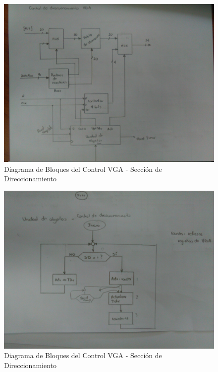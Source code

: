 \documentclass[12pt,a4paper]{report}
\begin{document}
\begin{figure}[hbtp]
	\centering
	\includegraphics[width=15cm]{Img/ControlDireccionamientoVGABloques.jpg}
	\caption{Diagrama de Bloques del Control VGA - Sección de Direccionamiento}
	\label{fig:DireccionamientoBloquesVGA1}
\end{figure}

\begin{figure}[hbtp]
	\centering
	\includegraphics[width=15cm]{Img/ControlDireccionamientoVGAFlujo.jpg}
	\caption{Diagrama de Bloques del Control VGA - Sección de Direccionamiento}
	\label{fig:DireccionamientoFlujoVGA1}
\end{figure}
\end{document}

